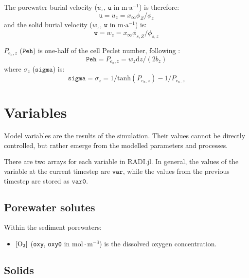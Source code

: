 \documentclass[a4paper]{article}
\newcommand{\D}[1]{\mathrm{d}#1}
\newcommand{\code}[1]{\texttt{#1}}
\newcommand{\molmmm}{\mathrm{mol}\cdot\mathrm{m}^{-3}}
\begin{document}
The porewater burial velocity ($u_z$, $\code{u}$ in m$\cdot$a$^{-1}$) is therefore:
\begin{equation}
\code{u} = u_z = x_\infty \phi_Z / \phi_z
\end{equation}
and the solid burial velocity ($w_z$, $\code{w}$ in m$\cdot$a$^{-1}$) is:
\begin{equation}
\code{w} = w_z = x_\infty \phi_{s,Z} / \phi_{s,z}
\end{equation}

$P_{e_\mathrm{h}, z}$ ($\code{Peh}$) is one-half of the cell Peclet number, following \citet{boudreau_method--lines_1996}:
\begin{equation}
\code{Peh} = P_{e_\mathrm{h}, z} = w_z \D{z} / (2 b_z)
\end{equation}
where $\sigma_z$ ($\code{sigma}$) is:
\begin{equation}
\code{sigma} = \sigma_z = 1 / \mathrm{tanh}(P_{e_\mathrm{h}, z}) - 1 / P_{e_\mathrm{h}, z}
\end{equation}



\section{Variables}

Model variables are the results of the simulation.  Their values cannot be directly controlled, but rather emerge from the modelled parameters and processes.

There are two arrays for each variable in RADI.jl. In general, the values of the variable at the current timestep are $\code{var}$, while the values from the previous timestep are stored as $\code{var0}$.


\subsection{Porewater solutes}

Within the sediment porewaters:
\begin{itemize}
  \item $[\ce{O2}]$ (\code{oxy}, \code{oxy0} in $\molmmm$) is the dissolved oxygen concentration.
\end{itemize}


\subsection{Solids}
\end{document}
